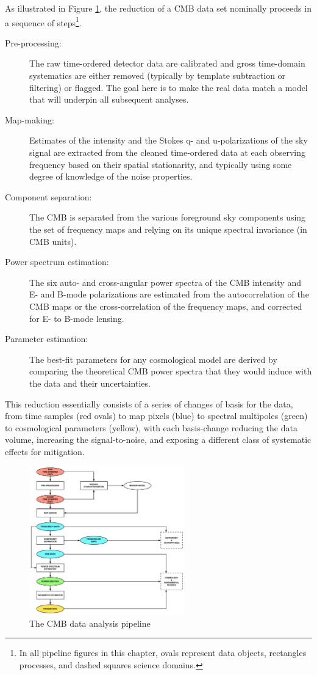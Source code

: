 As illustrated in Figure \ref{fig_da}, the reduction of a CMB data set nominally proceeds in a sequence of steps\footnote{In all pipeline figures in this chapter, ovals represent data objects, rectangles processes, and dashed squares science domains.}.
\begin{description}
\item[ Pre-processing:] The raw time-ordered detector data are calibrated and gross time-domain systematics are either removed (typically by template subtraction or filtering) or flagged. The goal here is to make the real data match a model that will underpin all subsequent analyses.
\item[Map-making:] Estimates of the intensity and the Stokes q- and u-polarizations of the sky signal are extracted from the cleaned time-ordered data at each observing frequency based on their spatial stationarity, and typically using some degree of knowledge of the noise properties.
\item[Component separation:] The CMB is separated from the various foreground sky components using the set of frequency maps and relying on its unique spectral invariance (in CMB units).
\item[Power spectrum estimation:] The six auto- and cross-angular power spectra of the CMB intensity and E- and B-mode polarizations are estimated from the autocorrelation of the CMB maps or the cross-correlation of the frequency maps, and corrected for E- to B-mode lensing.
\item[Parameter estimation:] The best-fit parameters for any cosmological model are derived by comparing the theoretical CMB power spectra that they would induce with the data and their uncertainties.
\end{description}
This reduction essentially consists of a series of changes of basis for the data, from time samples (red ovals) to map pixels (blue) to spectral multipoles (green) to cosmological parameters (yellow), with each basis-change reducing the data volume, increasing the signal-to-noise, and exposing a different class of systematic effects for mitigation.

\begin{figure}[htbp]
\hspace*{2.6in}\includegraphics[width=0.6\textwidth]{Analysis/da}
\caption{The CMB data analysis pipeline}
\label{fig_da}
\end{figure}

